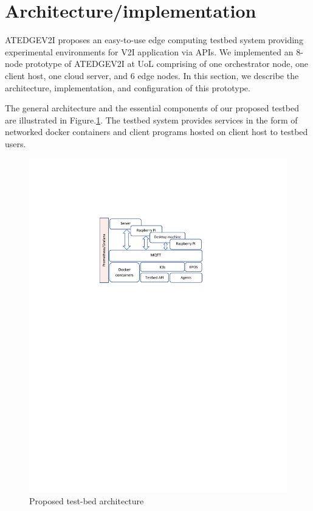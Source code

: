 \documentclass[conference]{IEEEtran}
\begin{document}
\section{Architecture/implementation}
\par ATEDGEV2I proposes an easy-to-use edge computing testbed system providing experimental environments for V2I application via APIs. We implemented an 8-node prototype of ATEDGEV2I at UoL comprising of one orchestrator node, one client host, one cloud server, and 6 edge nodes. In this section, we describe the architecture, implementation, and configuration of this prototype. 
\par The general architecture and the essential components of our proposed testbed are illustrated in Figure.\ref{fig:arch}. The testbed system provides services in the form of networked docker containers and client programs hosted on client host to testbed users. 
\begin{figure}[!htbp]
\centering
\includegraphics[clip, trim=4.7cm 17.5cm 5.9cm 5cm, width=\columnwidth]{figures/arch4.pdf}
\caption{Proposed test-bed architecture}
\label{fig:arch}
\end{figure}
\end{document}
